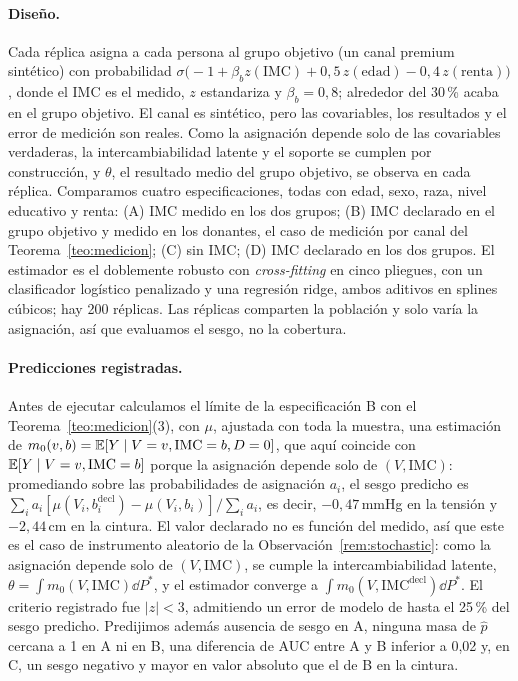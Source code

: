 \paragraph{Diseño.} Cada réplica asigna a cada persona al grupo objetivo (un canal premium sintético) con probabilidad $\sigma\bigl(-1+\beta_b z(\mathrm{IMC})+0,5\,z(\mathrm{edad})-0,4\,z(\mathrm{renta})\bigr)$, donde el IMC es el medido, $z$ estandariza y $\beta_b=0,8$; alrededor del 30\,\% acaba en el grupo objetivo. El canal es sintético, pero las covariables, los resultados y el error de medición son reales. Como la asignación depende solo de las covariables verdaderas, la intercambiabilidad latente y el soporte se cumplen por construcción, y $\theta$, el resultado medio del grupo objetivo, se observa en cada réplica. Comparamos cuatro especificaciones, todas con edad, sexo, raza, nivel educativo y renta: (A) IMC medido en los dos grupos; (B) IMC declarado en el grupo objetivo y medido en los donantes, el caso de medición por canal del Teorema~\ref{teo:medicion}; (C) sin IMC; (D) IMC declarado en los dos grupos. El estimador es el doblemente robusto con \emph{cross-fitting} en cinco pliegues, con un clasificador logístico penalizado y una regresión ridge, ambos aditivos en splines cúbicos; hay 200 réplicas. Las réplicas comparten la población y solo varía la asignación, así que evaluamos el sesgo, no la cobertura.

\paragraph{Predicciones registradas.} Antes de ejecutar calculamos el límite de la especificación B con el Teorema~\ref{teo:medicion}(3), con $\mu$, ajustada con toda la muestra, una estimación de $m_0(v,b)=\mathbb{E}[Y\mid V=v,\mathrm{IMC}=b,D=0]$, que aquí coincide con $\mathbb{E}[Y\mid V=v,\mathrm{IMC}=b]$ porque la asignación depende solo de $(V,\mathrm{IMC})$: promediando sobre las probabilidades de asignación $a_i$, el sesgo predicho es $\sum_ia_i[\mu(V_i,b_i^{\mathrm{decl}})-\mu(V_i,b_i)]/\sum_ia_i$, es decir, $-0,47$\,mmHg en la tensión y $-2,44$\,cm en la cintura. El valor declarado no es función del medido, así que este es el caso de instrumento aleatorio de la Observación~\ref{rem:stochastic}: como la asignación depende solo de $(V,\mathrm{IMC})$, se cumple la intercambiabilidad latente, $\theta=\int m_0(V,\mathrm{IMC})\dd P^*$, y el estimador converge a $\int m_0(V,\mathrm{IMC}^{\mathrm{decl}})\dd P^*$. El criterio registrado fue $|z|<3$, admitiendo un error de modelo de hasta el 25\,\% del sesgo predicho. Predijimos además ausencia de sesgo en A, ninguna masa de $\hat p$ cercana a 1 en A ni en B, una diferencia de AUC entre A y B inferior a 0,02 y, en C, un sesgo negativo y mayor en valor absoluto que el de B en la cintura.

